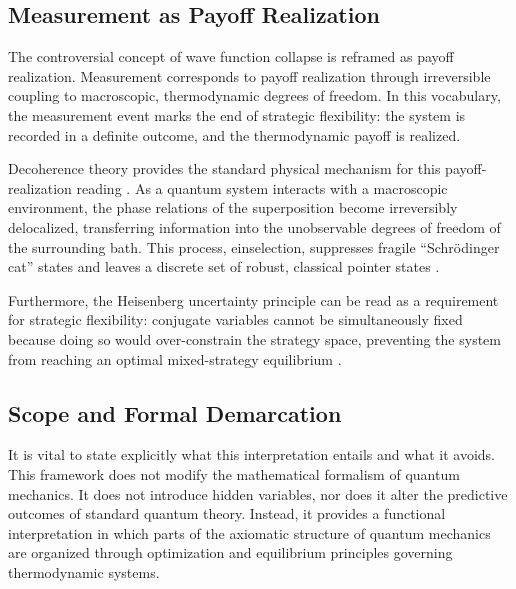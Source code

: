 \documentclass[12pt,a4paper]{article}
\theoremstyle{remark}
\begin{document}
\subsection{Measurement as Payoff Realization}

The controversial concept of wave function collapse is reframed as payoff realization. Measurement corresponds to payoff realization through irreversible coupling to macroscopic, thermodynamic degrees of freedom. In this vocabulary, the measurement event marks the end of strategic flexibility: the system is recorded in a definite outcome, and the thermodynamic payoff is realized.

Decoherence theory provides the standard physical mechanism for this payoff-realization reading \citep{MeasurementClassical}. As a quantum system interacts with a macroscopic environment, the phase relations of the superposition become irreversibly delocalized, transferring information into the unobservable degrees of freedom of the surrounding bath. This process, einselection, suppresses fragile ``Schr\"odinger cat'' states and leaves a discrete set of robust, classical pointer states \citep{Zurek2003}.

Furthermore, the Heisenberg uncertainty principle can be read as a requirement for strategic flexibility: conjugate variables cannot be simultaneously fixed because doing so would over-constrain the strategy space, preventing the system from reaching an optimal mixed-strategy equilibrium \citep{HeisenbergCovariant}.

\subsection{Scope and Formal Demarcation}

It is vital to state explicitly what this interpretation entails and what it avoids. This framework does not modify the mathematical formalism of quantum mechanics. It does not introduce hidden variables, nor does it alter the predictive outcomes of standard quantum theory. Instead, it provides a functional interpretation in which parts of the axiomatic structure of quantum mechanics are organized through optimization and equilibrium principles governing thermodynamic systems.
\end{document}
